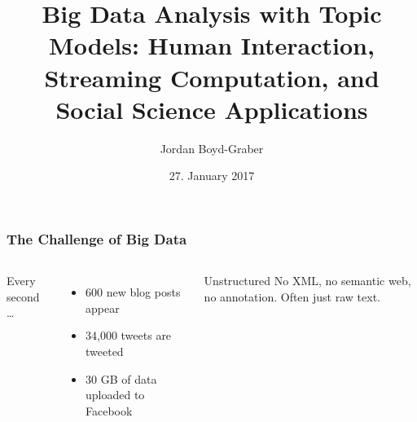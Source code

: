 \documentclass[compress]{beamer}
\title{Big Data Analysis with Topic Models: Human Interaction, Streaming Computation, and Social Science Applications}
\author{Jordan Boyd-Graber}
\date{27. January 2017}
\begin{document}

\frame{\titlepage}



\begin{frame}
\frametitle{The Challenge of Big Data}

\begin{columns}


Every second \dots
\begin{itemize}
  \item 600 new blog posts appear
  \item 34,000 tweets are tweeted
  \item 30 GB of data uploaded to Facebook
\end{itemize}
\pause

\begin{block}{Unstructured}
  No XML, no semantic web, no annotation.  Often just raw text.
\end{block}



\end{columns}

\end{frame}
\end{document}
